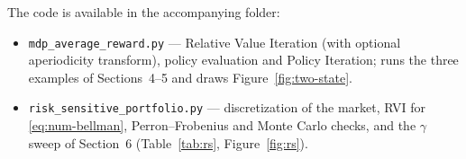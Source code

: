 \documentclass[11pt,a4paper]{article}
\begin{document}
The code is available in the accompanying folder:
\begin{itemize}
  \item \texttt{mdp\_average\_reward.py} --- Relative Value Iteration (with optional aperiodicity transform), policy evaluation and Policy Iteration; runs the three examples of Sections~4--5 and draws Figure~\ref{fig:two-state}.
  \item \texttt{risk\_sensitive\_portfolio.py} --- discretization of the market, RVI for \eqref{eq:num-bellman}, Perron--Frobenius and Monte Carlo checks, and the $\gamma$ sweep of Section~6 (Table~\ref{tab:rs}, Figure~\ref{fig:rs}).
\end{itemize}
\end{document}
